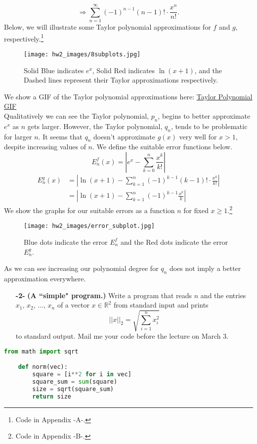 \documentclass[11pt]{article}
\theoremstyle{definition}
\newcommand{\R}{\mathbb{R}}
\newcommand{\1}[1]{\mathbf{1} \left \{ #1 \right \}}
\begin{document}
\[\Longrightarrow \sum_{n=1}^{\infty} (-1)^{n-1} (n-1)! \cdot \frac{x^n}{n!}.\]
Below, we will illustrate some Taylor polynomial approximations for $f$ and $g$, respectively.\footnote{Code in Appendix -A-.}
\begin{figure}[H]
    \centering
    \texttt{[image: hw2\_images/8subplots.jpg]}
    \caption{Solid Blue indicates $e^x$, Solid Red indicates $\ln(x+1)$, and the Dashed lines represent their Taylor approximations respectively.}
    \label{fig:my_label}
\end{figure}
We show a GIF of the Taylor polynomial approximations here:
\href{https://github.com/3rundane/Numerical-Analysis-Project/blob/main/homework\%202\%20gifs/problemgif.gif}{Taylor Polynomial GIF} \\

Qualitatively we can see the Taylor polynomial, $p_n$, begins to better approximate $e^x$ as $n$ gets larger.  However, the Taylor polynomial, $q_n$, tends to be problematic for larger $n$.  It seems that $q_n$ doesn't approximate $g(x)$ very well for $x>1$, despite increasing values of $n$.  We define the suitable error functions below.
\[E_n^f (x) = \left|e^x - \sum_{k=0}^n \frac{x^k}{k!}\right|\]
\begin{equation*}
    \begin{split}
        E_n^g (x) &= \left|\ln (x+1) - \sum_{k=1}^n (-1)^{k-1} (k-1)! \cdot \frac{x^k}{k!}\right| \\
        &= \left|\ln (x+1) - \sum_{k=1}^n (-1)^{k-1} \frac{x^k}{k}\right|
    \end{split}
\end{equation*}
We show the graphs for our suitable errors as a function $n$ for fixed $x \geq 1$.\footnote{Code in Appendix -B-.}
\begin{figure}[H]
    \centering
    \texttt{[image: hw2\_images/error\_subplot.jpg]}
    \caption{Blue dots indicate the error $E_n^f$ and the Red dots indicate the error $E_n^g$.}
    \label{fig:my_label}
\end{figure}
As we can see increasing our polynomial degree for $q_n$ does not imply a better approximation everywhere.

\begin{itemize}
    \item[{\textbf{-2-}}] \textbf{(A ``simple" program.)}  Write a program that reads $n$ and the entries $x_1$, $x_2$, ..., $x_n$ of a vector $x \in \R^2$ from standard input and prints
    \begin{equation*}
        ||x||_2 = \sqrt{\sum_{i=1}^n x_i^2}
    \end{equation*}
    to standard output.  Mail me your code before the lecture on March 3.
\end{itemize}
\begin{lstlisting}[language=Python]
    from math import sqrt

    def norm(vec):
        square = [i**2 for i in vec]
        square_sum = sum(square)
        size = sqrt(square_sum)
        return size
\end{lstlisting}
\end{document}
